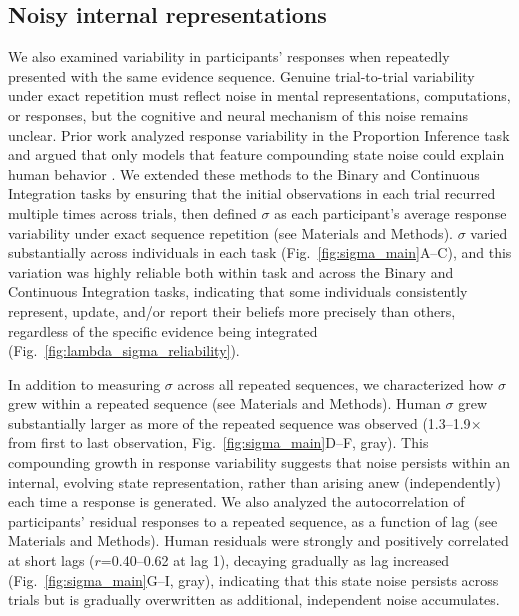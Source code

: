 \documentclass[12pt]{article}
\begin{document}
\subsection{Noisy internal representations}
We also examined variability in participants' responses when repeatedly presented with the same evidence sequence. Genuine trial-to-trial variability under exact repetition must reflect noise in mental representations, computations, or responses, but the cognitive and neural mechanism of this noise remains unclear. Prior work analyzed response variability in the Proportion Inference task and argued that only models that feature compounding state noise could explain human behavior \cite{prat2024imprecise}. We extended these methods to the Binary and Continuous Integration tasks by ensuring that the initial observations in each trial recurred multiple times across trials, then defined $\sigma$ as each participant's average response variability under exact sequence repetition (see Materials and Methods). $\sigma$ varied substantially across individuals in each task (Fig.~\ref{fig:sigma_main}A--C), and this variation was highly reliable both within task and across the Binary and Continuous Integration tasks, indicating that some individuals consistently represent, update, and/or report their beliefs more precisely than others, regardless of the specific evidence being integrated (Fig.~\ref{fig:lambda_sigma_reliability}).

In addition to measuring $\sigma$ across all repeated sequences, we characterized how $\sigma$ grew within a repeated sequence (see Materials and Methods). Human $\sigma$ grew substantially larger as more of the repeated sequence was observed (1.3--1.9$\times$ from first to last observation, Fig.~\ref{fig:sigma_main}D--F, gray). This compounding growth in response variability suggests that noise persists within an internal, evolving state representation, rather than arising anew (independently) each time a response is generated. We also analyzed the autocorrelation of participants' residual responses to a repeated sequence, as a function of lag (see Materials and Methods). Human residuals were strongly and positively correlated at short lags ($r$=0.40--0.62 at lag 1), decaying gradually as lag increased (Fig.~\ref{fig:sigma_main}G--I, gray), indicating that this state noise persists across trials but is gradually overwritten as additional, independent noise accumulates.
\end{document}
